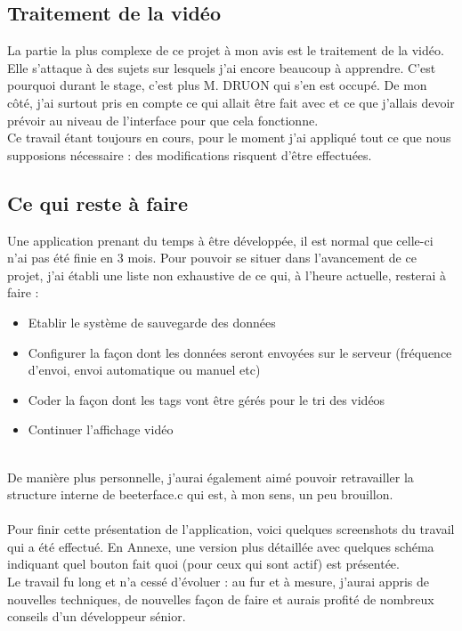 \documentclass[11pt,french,a4paper]{report}
\begin{document}
        \subsection{Traitement de la vidéo}
La partie la plus complexe de ce projet à mon avis est le traitement de la vidéo. Elle s'attaque à des sujets sur lesquels j'ai 
encore beaucoup à apprendre. C'est pourquoi durant le stage, c'est plus M. DRUON qui s'en est occupé. De mon côté, j'ai surtout
pris en compte ce qui allait être fait avec et ce que j'allais devoir prévoir au niveau de l'interface pour que cela fonctionne. \\
Ce travail étant toujours en cours, pour le moment j'ai appliqué tout ce que nous supposions nécessaire : des modifications risquent 
d'être effectuées.
        \subsection{Ce qui reste à faire}
Une application prenant du temps à être développée, il est normal que celle-ci n'ai pas été finie en 3 mois. Pour pouvoir se situer
dans l'avancement de ce projet, j'ai établi une liste non exhaustive de ce qui, à l'heure actuelle, resterai à faire : \\ 

\begin{itemize}
    \item Etablir le système de sauvegarde des données
    \item Configurer la façon dont les données seront envoyées sur le serveur (fréquence d'envoi, envoi automatique ou manuel etc) 
    \item Coder la façon dont les tags vont être  gérés pour le tri des vidéos 
    \item Continuer l'affichage vidéo
\end{itemize} 
\\
De manière plus personnelle, j'aurai également aimé pouvoir retravailler la structure interne de beeterface.c qui est, à mon sens,
un peu brouillon. \\
\\
Pour finir cette présentation de l'application, voici quelques screenshots du travail qui a été effectué. En Annexe, une version plus
détaillée avec quelques schéma indiquant quel bouton fait quoi (pour ceux qui sont actif) est présentée. \\
Le travail fu long et n'a cessé d'évoluer : au fur et à mesure, j'aurai appris de nouvelles techniques, de nouvelles façon de faire 
et aurais profité de nombreux conseils d'un développeur sénior. \\
\end{document}
